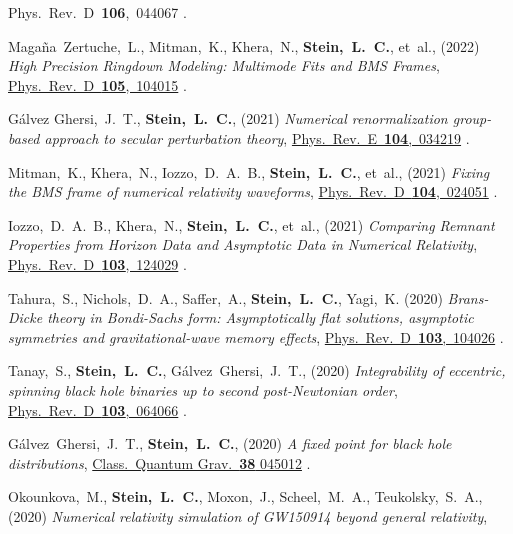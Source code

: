 \begin{etaremune}[start=\value{pubCounter}]
  {Phys.~Rev.~D~{\bf 106},~044067}
  .
\item
  Magaña~Zertuche,~L.,
  Mitman,~K.,
  Khera,~N.,
  {\bf Stein,~L.~C.},
  et~al.,
  (2022)
  {\it High Precision Ringdown Modeling: Multimode Fits and BMS Frames},
  \href{https://doi.org/10.1103/PhysRevD.105.104015}%
  {Phys.~Rev.~D~{\bf 105},~104015}
  .
\item
  Gálvez Ghersi,~J.~T.,
  {\bf Stein,~L.~C.},
  (2021)
  {\it Numerical renormalization group-based approach to secular perturbation theory},
  \href{https://doi.org/10.1103/PhysRevE.104.034219}%
  {Phys.~Rev.~E~{\bf 104},~034219}
  .
\item
  Mitman,~K.,
  Khera,~N.,
  Iozzo,~D.~A.~B.,
  {\bf Stein,~L.~C.},
  et~al.,
  (2021)
  {\it Fixing the BMS frame of numerical relativity waveforms},
  \href{https://doi.org/10.1103/PhysRevD.104.024051}%
  {Phys.~Rev.~D~{\bf 104},~024051}
  .
\item
  Iozzo,~D.~A.~B.,
  Khera,~N.,
  {\bf Stein,~L.~C.},
  et~al.,
  (2021)
  {\it Comparing Remnant Properties from Horizon Data and Asymptotic Data in Numerical Relativity},
  \href{https://doi.org/10.1103/PhysRevD.103.124029}%
  {Phys.~Rev.~D~{\bf 103},~124029}
  .
\item
  Tahura,~S.,
  Nichols,~D.~A.,
  Saffer,~A.,
  {\bf Stein,~L.~C.},
  Yagi,~K.
  (2020)
  {\it Brans-Dicke theory in Bondi-Sachs form: Asymptotically flat solutions, asymptotic symmetries and gravitational-wave memory effects},
  \href{https://doi.org/10.1103/PhysRevD.103.104026}%
  {Phys.~Rev.~D~{\bf 103},~104026}
  .
\item
  Tanay,~S.,
  {\bf Stein,~L.~C.},
  Gálvez~Ghersi,~J.~T.,
  (2020)
  {\it Integrability of eccentric, spinning black hole binaries up to second post-Newtonian order},
  \href{https://doi.org/10.1103/PhysRevD.103.064066}%
  {Phys.~Rev.~D~{\bf 103},~064066}
  .
\item
  Gálvez~Ghersi,~J.~T.,
  {\bf Stein,~L.~C.},
  (2020)
  {\it A fixed point for black hole distributions},
  \href{https://doi.org/10.1088/1361-6382/abcfd2}
  {Class.~Quantum Grav.~{\bf 38} 045012}
  .
\item
  Okounkova,~M.,
  {\bf Stein,~L.~C.},
  Moxon,~J.,
  Scheel,~M.~A.,
  Teukolsky,~S.~A.,
  (2020)
  {\it Numerical relativity simulation of GW150914 beyond general relativity},

\end{etaremune}
